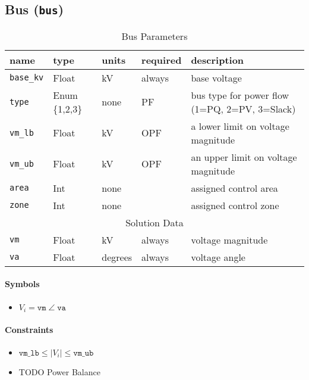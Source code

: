 \documentclass{article}
\begin{document}
\subsection{Bus (\texttt{bus})}

\begin{table}[h]
\centering
\caption{Bus Parameters}
\begin{tabular}{|l|l|l|l|p{7cm}|}
\hline
name & type & units & required & description \\ 
\hline
\hline
\texttt{base\_kv} & Float & kV & always & base voltage \\ 
\hline
\texttt{type} & Enum \{1,2,3\} & none & PF & bus type for power flow (1=PQ, 2=PV, 3=Slack) \\ 
\hline
\texttt{vm\_lb} & Float & kV & OPF & a lower limit on voltage magnitude \\ 
\hline
\texttt{vm\_ub} & Float & kV & OPF & an upper limit on voltage magnitude \\ 
\hline
\texttt{area} & Int & none & & assigned control area \\ 
\hline
\texttt{zone} & Int & none & & assigned control zone \\ 
\hline
\hline
\multicolumn{5}{|c|}{Solution Data} \\
\hline
\texttt{vm} & Float & kV & always & voltage magnitude \\ 
\hline
\texttt{va} & Float & degrees & always & voltage angle \\ 
\hline
\end{tabular}
\label{tbl:bus}
\end{table}

\paragraph{Symbols}
\begin{itemize}
    \item $V_i = \texttt{vm} \; \angle \; \texttt{va}$
\end{itemize}

\paragraph{Constraints}
\begin{itemize}
    \item $ \texttt{vm\_lb} \leq |V_i| \leq  \texttt{vm\_ub}$
    \item TODO Power Balance
\end{itemize}
\end{document}
